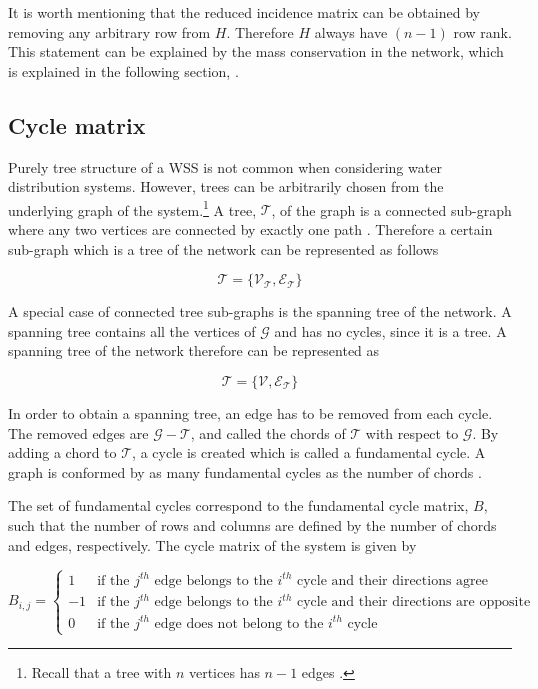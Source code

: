 It is worth mentioning that the reduced incidence matrix can be obtained by removing any arbitrary row from $H$. Therefore $H$ always have $(n-1)$ row rank. This statement can be explained by the mass conservation in the network, which is explained in the following section, .

\subsection{Cycle matrix}
\label{cycle_matrix}

Purely tree structure of a WSS is not common when considering water distribution systems. However, trees can be arbitrarily chosen from the underlying graph of the system.\footnote{Recall that a tree with $n$ vertices has $n-1$ edges \cite{deo2017graph}.}  A tree, $\mathcal{T} $, of the graph is a connected sub-graph where any two vertices are connected by exactly one path \cite{deo2017graph}. Therefore a certain sub-graph which is a tree of the network can be represented as follows

\begin{equation}
  \label{Numberofchords}
  \mathcal{T} = \{\mathcal{V_{\mathcal{T}}}, \mathcal{E_{\mathcal{T}}} \} 
\end{equation}

A special case of connected tree sub-graphs is the spanning tree of the network. A spanning tree contains all the vertices of $\mathcal{G}$ and has no cycles, since it is a tree. A spanning tree of the network therefore can be represented as

\begin{equation}
  \label{Numberofchords}
  \mathcal{T} = \{\mathcal{V}, \mathcal{E_{\mathcal{T}}} \} 
\end{equation}

In order to obtain a spanning tree, an edge has to be removed from each cycle. The removed edges are $\mathcal{G} - \mathcal{T}$, and called the chords of $\mathcal{T}$ with respect to $\mathcal{G}$. By adding a chord to $\mathcal{T}$, a cycle is created which is called a fundamental cycle. A graph is conformed by as many fundamental cycles as the number of chords \cite{deo2017graph}.

The set of fundamental cycles correspond to the fundamental cycle matrix, $B$, such that the number of rows and columns are defined by the number of chords and edges, respectively. The cycle matrix of the system is given by

\begin{equation}
\label{DiGraphCycle}
 B_{i,j} =
		\left\{
		\begin{array}{ll}
		
		1 			&     \text{if the $j^{th}$ edge belongs to the $i^{th}$ cycle and their directions agree}	
\\
		-1          &     \text{if the $j^{th}$ edge belongs to the $i^{th}$ cycle and their directions are opposite}
\\
        0           &     \text{if the $j^{th}$ edge does not belong to the $i^{th}$ cycle}
		\end{array}
		\right.
\end{equation}	

